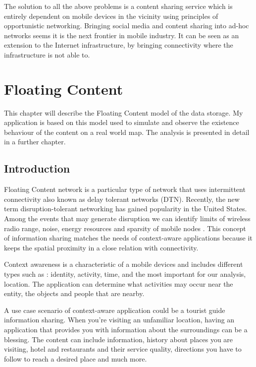 The solution to all the above problems is a content sharing service which is
entirely dependent on mobile devices in the vicinity using principles of
opportunistic networking. Bringing social media and content sharing into ad-hoc
networks seems it is the next frontier in mobile industry. It can be seen as an
extension to the Internet infrastructure, by bringing connectivity where the
infrastructure is not able to.





\chapter{Floating Content} \label{chap2}


This chapter will describe the Floating Content model of the data storage.
My application is based on this model used to simulate and observe the existence
behaviour of the content on a real world map. The analysis is presented in
detail in a further chapter.

\section{Introduction}
Floating Content network is a particular type of network that uses intermittent
connectivity also known as delay tolerant networks (DTN). Recently, the new term
disruption-tolerant networking has gained popularity in the United States.
Among the events that may generate disruption we can identify limits of wireless
radio range, noise, energy resources and sparsity of mobile nodes
\cite{wikipedia_dtn}. This concept of information sharing matches the needs of
context-aware applications because it keeps the spatial proximity in a close
relation with connectivity.

Context awareness is a characteristic of a mobile devices and includes different
types such as : identity, activity, time, and the most important for our
analysis, location. The application can determine what activities may occur near
the entity, the objects and people that are nearby.

A use case scenario of context-aware application could be a tourist guide
information sharing. When you're visiting an unfamiliar location, having an
application that provides you with information about the surroundings can be a
blessing. The content can include information, history about places you are
visiting, hotel and restaurants and their service quality, directions you have
to follow to reach a desired place and much more.

